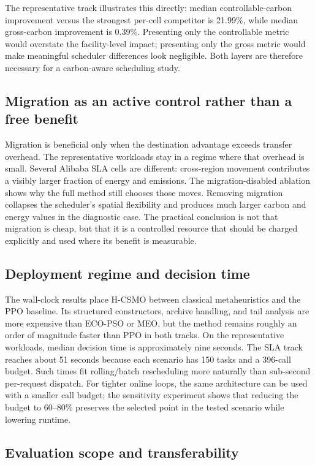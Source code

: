 \documentclass[preprint,12pt]{elsarticle}
\newcommand{\method}{H-CSMO\xspace}
\begin{document}
The representative track illustrates this directly: median controllable-carbon improvement versus the strongest per-cell competitor is 21.99\%, while median gross-carbon improvement is 0.39\%. Presenting only the controllable metric would overstate the facility-level impact; presenting only the gross metric would make meaningful scheduler differences look negligible. Both layers are therefore necessary for a carbon-aware scheduling study.

\subsection{Migration as an active control rather than a free benefit}

Migration is beneficial only when the destination advantage exceeds transfer overhead. The representative workloads stay in a regime where that overhead is small. Several Alibaba SLA cells are different: cross-region movement contributes a visibly larger fraction of energy and emissions. The migration-disabled ablation shows why the full method still chooses those moves. Removing migration collapses the scheduler's spatial flexibility and produces much larger carbon and energy values in the diagnostic case. The practical conclusion is not that migration is cheap, but that it is a controlled resource that should be charged explicitly and used where its benefit is measurable.

\subsection{Deployment regime and decision time}

The wall-clock results place \method between classical metaheuristics and the PPO baseline. Its structured constructors, archive handling, and tail analysis are more expensive than ECO-PSO or MEO, but the method remains roughly an order of magnitude faster than PPO in both tracks. On the representative workloads, median decision time is approximately nine seconds. The SLA track reaches about 51 seconds because each scenario has 150 tasks and a 396-call budget. Such times fit rolling/batch rescheduling more naturally than sub-second per-request dispatch. For tighter online loops, the same architecture can be used with a smaller call budget; the sensitivity experiment shows that reducing the budget to 60--80\% preserves the selected point in the tested scenario while lowering runtime.

\subsection{Evaluation scope and transferability}
\end{document}
